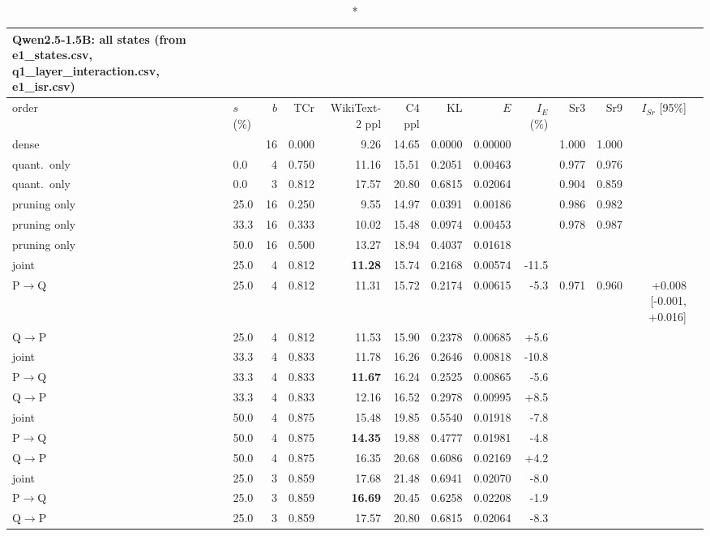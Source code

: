 \documentclass{article}
\begin{document}
\begin{longtable}{llrrrrrrrrrrl}
\caption*{\textbf{Qwen2.5-1.5B}: all states (from e1\_states.csv, q1\_layer\_interaction.csv, e1\_isr.csv)}\\
\toprule order & $s$ (\%) & $b$ & TCr & WikiText-2 ppl & C4 ppl & KL & $E$ & $I_E$ (\%) & Sr3 & Sr9 & $I_{Sr}$ [95\%] \\ \midrule \endhead
dense &  & 16 & 0.000 & 9.26 & 14.65 & 0.0000 & 0.00000 &  & 1.000 & 1.000 &  \\
quant.\ only & 0.0 & 4 & 0.750 & 11.16 & 15.51 & 0.2051 & 0.00463 &  & 0.977 & 0.976 &  \\
quant.\ only & 0.0 & 3 & 0.812 & 17.57 & 20.80 & 0.6815 & 0.02064 &  & 0.904 & 0.859 &  \\
pruning only & 25.0 & 16 & 0.250 & 9.55 & 14.97 & 0.0391 & 0.00186 &  & 0.986 & 0.982 &  \\
pruning only & 33.3 & 16 & 0.333 & 10.02 & 15.48 & 0.0974 & 0.00453 &  & 0.978 & 0.987 &  \\
pruning only & 50.0 & 16 & 0.500 & 13.27 & 18.94 & 0.4037 & 0.01618 &  &  &  &  \\
joint & 25.0 & 4 & 0.812 & \textbf{11.28} & 15.74 & 0.2168 & 0.00574 & -11.5 &  &  &  \\
P$\to$Q & 25.0 & 4 & 0.812 & 11.31 & 15.72 & 0.2174 & 0.00615 & -5.3 & 0.971 & 0.960 & +0.008 [-0.001, +0.016] \\
Q$\to$P & 25.0 & 4 & 0.812 & 11.53 & 15.90 & 0.2378 & 0.00685 & +5.6 &  &  &  \\
joint & 33.3 & 4 & 0.833 & 11.78 & 16.26 & 0.2646 & 0.00818 & -10.8 &  &  &  \\
P$\to$Q & 33.3 & 4 & 0.833 & \textbf{11.67} & 16.24 & 0.2525 & 0.00865 & -5.6 &  &  &  \\
Q$\to$P & 33.3 & 4 & 0.833 & 12.16 & 16.52 & 0.2978 & 0.00995 & +8.5 &  &  &  \\
joint & 50.0 & 4 & 0.875 & 15.48 & 19.85 & 0.5540 & 0.01918 & -7.8 &  &  &  \\
P$\to$Q & 50.0 & 4 & 0.875 & \textbf{14.35} & 19.88 & 0.4777 & 0.01981 & -4.8 &  &  &  \\
Q$\to$P & 50.0 & 4 & 0.875 & 16.35 & 20.68 & 0.6086 & 0.02169 & +4.2 &  &  &  \\
joint & 25.0 & 3 & 0.859 & 17.68 & 21.48 & 0.6941 & 0.02070 & -8.0 &  &  &  \\
P$\to$Q & 25.0 & 3 & 0.859 & \textbf{16.69} & 20.45 & 0.6258 & 0.02208 & -1.9 &  &  &  \\
Q$\to$P & 25.0 & 3 & 0.859 & 17.57 & 20.80 & 0.6815 & 0.02064 & -8.3 &  &  &  \\

\end{longtable}
\end{document}
